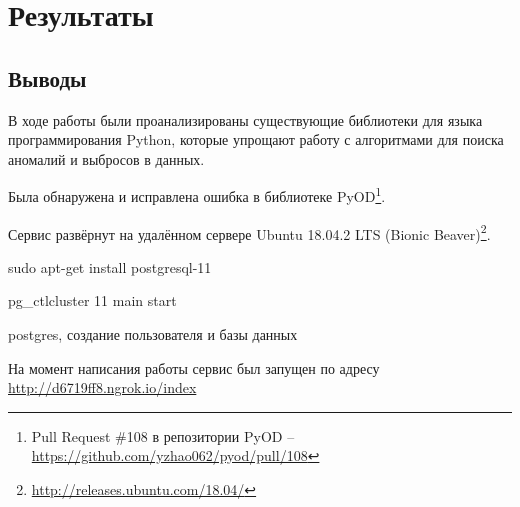 \chapter{Результаты} \label{ch:ch5}

\section{Выводы} \label{ch:ch5/sect1}

В ходе работы были проанализированы существующие библиотеки для языка программирования Python, которые упрощают работу с алгоритмами для поиска аномалий и выбросов в данных.

Была обнаружена и исправлена ошибка в библиотеке PyOD\footnote{Pull Request \#108 в репозитории PyOD -- \url{https://github.com/yzhao062/pyod/pull/108}}.

Сервис развёрнут на удалённом сервере Ubuntu 18.04.2 LTS (Bionic Beaver)\footnote{\url{http://releases.ubuntu.com/18.04/}}.

sudo apt-get install postgresql-11

pg\_ctlcluster 11 main start

postgres, создание пользователя и базы данных

На момент написания работы сервис был запущен по адресу \url{http://d6719ff8.ngrok.io/index}

\clearpage